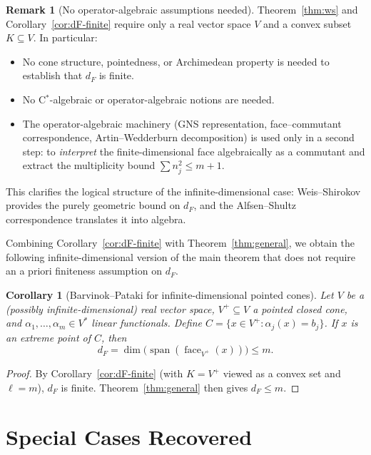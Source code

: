\documentclass[11pt,a4paper]{article}
\newtheorem{corollary}[theorem]{Corollary}
\theoremstyle{definition}
\newtheorem{remark}[theorem]{Remark}
\newcommand{\spn}{\operatorname{span}}
\newcommand{\face}{\operatorname{face}}
\begin{document}
\begin{remark}[No operator-algebraic assumptions needed]
\label{rmk:no-opalg}
Theorem~\ref{thm:ws} and Corollary~\ref{cor:dF-finite} require
only a real vector space $V$ and a convex subset $K \subseteq V$.
In particular:
\begin{itemize}
\item No cone structure, pointedness, or Archimedean property is
  needed to establish that $d_F$ is finite.
\item No C$^*$-algebraic or operator-algebraic notions are needed.
\item The operator-algebraic machinery (GNS representation,
  face--commutant correspondence, Artin--Wedderburn decomposition)
  is used only in a second step: to \emph{interpret} the
  finite-dimensional face algebraically as a commutant and extract
  the multiplicity bound $\sum n_j^2 \leq m + 1$.
\end{itemize}
This clarifies the logical structure of the infinite-dimensional
case: Weis--Shirokov provides the purely geometric bound on $d_F$,
and the Alfsen--Shultz correspondence translates it into algebra.
\end{remark}

Combining Corollary~\ref{cor:dF-finite} with
Theorem~\ref{thm:general}, we obtain the following
infinite-dimensional version of the main theorem that does not
require an a priori finiteness assumption on $d_F$.

\begin{corollary}[Barvinok--Pataki for infinite-dimensional
pointed cones]\label{cor:inf-dim}
Let $V$ be a (possibly infinite-dimensional) real vector space,
$V^+ \subseteq V$ a pointed closed cone, and
$\alpha_1, \ldots, \alpha_m \in V^*$ linear functionals.  Define
$C = \{x \in V^+ : \alpha_j(x) = b_j\}$.  If $x$ is an extreme
point of $C$, then
\[
  d_F = \dim\bigl(\spn(\face_{V^+}(x))\bigr) \leq m.
\]
\end{corollary}

\begin{proof}
By Corollary~\ref{cor:dF-finite} (with $K = V^+$ viewed as a
convex set and $\ell = m$), $d_F$ is finite.
Theorem~\ref{thm:general} then gives $d_F \leq m$.
\end{proof}

\section{Special Cases Recovered}
\end{document}
